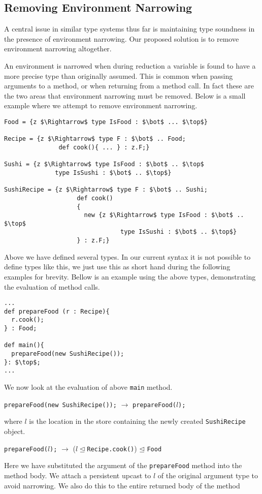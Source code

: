 \documentclass{llncs}
\numberwithin{subcase}{casethm}
\numberwithin{casethm}{theorem}
\numberwithin{casethm}{lemma}
\begin{document}
\subsection{Removing Environment Narrowing}

A central issue in similar type systems thus far is maintaining 
type soundness in the presence of environment narrowing. Our 
proposed solution is to remove environment narrowing altogether.

An environment is narrowed when during reduction a variable is 
found to have a more precise type than originally assumed. This 
is common when passing arguments to a method, or when returning 
from a method call. In fact these are the two areas that environment 
narrowing must be removed. Below is a small example where we attempt to 
remove environment narrowing.
\begin{lstlisting}[mathescape, style=custom_lang]
Food = {z $\Rightarrow$ type IsFood : $\bot$ ... $\top$}

Recipe = {z $\Rightarrow$ type F : $\bot$ .. Food;
               def cook(){ ... } : z.F;}
               
Sushi = {z $\Rightarrow$ type IsFood : $\bot$ .. $\top$
              type IsSushi : $\bot$ .. $\top$}

SushiRecipe = {z $\Rightarrow$ type F : $\bot$ .. Sushi;
                    def cook()
                    {
                      new {z $\Rightarrow$ type IsFood : $\bot$ .. $\top$
                                type IsSushi : $\bot$ .. $\top$}
                    } : z.F;}
\end{lstlisting}
Above we have defined several types. In our current syntax 
it is not possible to define types like this, we just use this 
as short hand during the following examples for brevity. Bellow 
is an example using the above types, demonstrating the evaluation 
of method calls.
\begin{lstlisting}[mathescape, style=custom_lang]
...
def prepareFood (r : Recipe){
  r.cook();
} : Food;

def main(){
  prepareFood(new SushiRecipe());
}: $\top$;
...
\end{lstlisting}
We now look at the evaluation of above \texttt{main} method.
\begin{center}
\texttt{prepareFood(new SushiRecipe());} $\rightarrow$ \texttt{prepareFood($l$);}
\end{center}
where $l$ is the location in 
the store containing the newly created \texttt{SushiRecipe} object.
\begin{center}
\texttt{prepareFood($l$);} $\rightarrow$ ($l\unlhd$\texttt{Recipe.cook()}) 
$\unlhd$ \texttt{Food}
\end{center}
Here we have substituted the argument of the \texttt{prepareFood} method 
into the method body. We attach a persistent upcast to $l$ of the original 
argument type to avoid narrowing. We also do this to the entire returned body 
of the method
\end{document}
